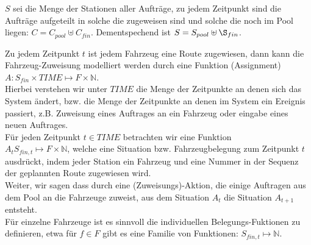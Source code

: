 \documentclass{article}
\begin{document}
$S$ sei die Menge der Stationen aller Aufträge, zu jedem Zeitpunkt sind die Aufträge aufgeteilt in solche die zugeweisen sind und solche die noch im Pool liegen:  $C = C_{pool} \uplus C_{fin}$. 
Dementspechend ist $S = S_{pool} \uplus \S_{fin}$.

Zu jedem Zeitpunkt $t$ ist jedem Fahrzeug eine Route zugewiesen, dann kann die Fahrzeug-Zuweisung modelliert werden durch eine Funktion (Assignment)\\
$A: S_{fin} \times TIME \mapsto F \times \mathbb{N}$.\\
Hierbei verstehen wir unter $TIME$ die Menge der Zeitpunkte an denen sich das System ändert, bzw. die Menge der Zeitpunkte an denen im System ein Ereignis passiert, z.B. Zuweisung eines Auftrages an ein Fahrzeug oder eingabe eines neuen Auftrages.\\

Für jeden Zeitpunkt $t \in TIME$ betrachten wir eine Funktion\\
$A_t S_{fin,t} \mapsto F \times \mathbb{N}$, welche eine Situation bzw. Fahrzeugbelegung zum Zeitpunkt $t$ ausdrückt, indem jeder Station ein Fahrzeug und eine Nummer in der Sequenz der geplannten Route zugewiesen wird.
\\
Weiter, wir sagen dass durch eine (Zuweisungs)-Aktion, die einige Auftragen aus dem Pool an die Fahrzeuge zuweist, aus dem Situation $A_t$ die Situation $A_{t+1}$ entsteht.\\
Für einzelne Fahrzeuge ist es sinnvoll die individuellen Belegungs-Fuktionen zu definieren,
etwa für $f \in F$ gibt es eine Familie von Funktionen: $S_{fin,t} \mapsto \mathbb{N}$. \\
\end{document}
